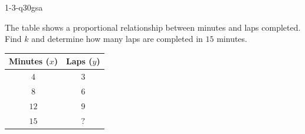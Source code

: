 \begin{practiceQuestion}{1-3-q30}{gsa}
\begin{questionText}
The table shows a proportional relationship between minutes and laps completed. Find $k$ and determine how many laps are completed in $15$ minutes.

\begin{center}
\begin{tabular}{|c|c|}
\hline
\textbf{Minutes ($x$)} & \textbf{Laps ($y$)} \\ \hline
$4$ & $3$ \\ \hline
$8$ & $6$ \\ \hline
$12$ & $9$ \\ \hline
$15$ & $?$ \\ \hline
\end{tabular}
\end{center}
\end{questionText}
\end{practiceQuestion}
